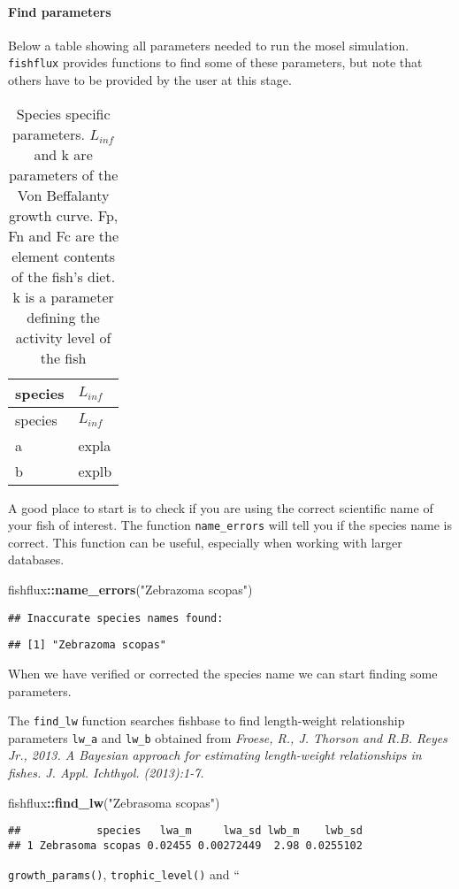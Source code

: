 \documentclass[]{article}
\newenvironment{Shaded}{\begin{snugshade}}{\end{snugshade}}
\newcommand{\KeywordTok}[1]{\textcolor[rgb]{0.13,0.29,0.53}{\textbf{#1}}}
\newcommand{\NormalTok}[1]{#1}
\newcommand{\OperatorTok}[1]{\textcolor[rgb]{0.81,0.36,0.00}{\textbf{#1}}}
\newcommand{\StringTok}[1]{\textcolor[rgb]{0.31,0.60,0.02}{#1}}
\let\oldparagraph\paragraph
\renewcommand{\paragraph}[1]{\oldparagraph{#1}\mbox{}}
\begin{document}
\hypertarget{find-parameters}{%
\paragraph{Find parameters}\label{find-parameters}}

Below a table showing all parameters needed to run the mosel simulation.
\texttt{fishflux} provides functions to find some of these parameters,
but note that others have to be provided by the user at this stage.

\begin{longtable}[]{@{}ll@{}}
\caption{Species specific parameters. \(L_{inf}\) and k are parameters
of the Von Beffalanty growth curve. Fp, Fn and Fc are the element
contents of the fish's diet. k is a parameter defining the activity
level of the fish}\tabularnewline
\toprule
species & \(L_{inf}\)\tabularnewline
\midrule
\endfirsthead
\toprule
species & \(L_{inf}\)\tabularnewline
\midrule
\endhead
a & expla\tabularnewline
b & explb\tabularnewline
\bottomrule
\end{longtable}

A good place to start is to check if you are using the correct
scientific name of your fish of interest. The function
\texttt{name\_errors} will tell you if the species name is correct. This
function can be useful, especially when working with larger databases.

\begin{Shaded}
\begin{Highlighting}[]
\NormalTok{fishflux}\OperatorTok{::}\KeywordTok{name_errors}\NormalTok{(}\StringTok{"Zebrazoma scopas"}\NormalTok{)}
\end{Highlighting}
\end{Shaded}

\begin{verbatim}
## Inaccurate species names found:
\end{verbatim}

\begin{verbatim}
## [1] "Zebrazoma scopas"
\end{verbatim}

When we have verified or corrected the species name we can start finding
some parameters.

The \texttt{find\_lw} function searches fishbase to find length-weight
relationship parameters \texttt{lw\_a} and \texttt{lw\_b} obtained from
\emph{Froese, R., J. Thorson and R.B. Reyes Jr., 2013. A Bayesian
approach for estimating length-weight relationships in fishes. J. Appl.
Ichthyol. (2013):1-7.}

\begin{Shaded}
\begin{Highlighting}[]
\NormalTok{fishflux}\OperatorTok{::}\KeywordTok{find_lw}\NormalTok{(}\StringTok{"Zebrasoma scopas"}\NormalTok{)}
\end{Highlighting}
\end{Shaded}

\begin{verbatim}
##            species   lwa_m     lwa_sd lwb_m    lwb_sd
## 1 Zebrasoma scopas 0.02455 0.00272449  2.98 0.0255102
\end{verbatim}

\texttt{growth\_params()}, \texttt{trophic\_level()} and ``
\end{document}
